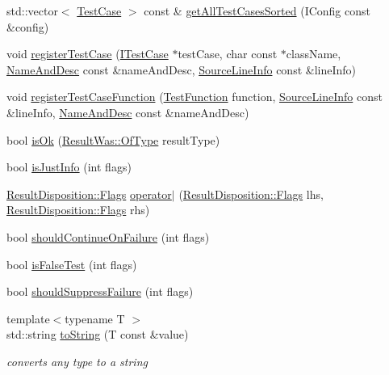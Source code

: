 \begin{DoxyCompactItemize}
\item 
std\-::vector$<$ \hyperlink{classCatch_1_1TestCase}{Test\-Case} $>$ const \& \hyperlink{namespaceCatch_a1c9b1a23bc947ea70ddaabf067276cf2}{get\-All\-Test\-Cases\-Sorted} (I\-Config const \&config)
\item 
void \hyperlink{namespaceCatch_a9a59d681cc327a33c280796561dfe258}{register\-Test\-Case} (\hyperlink{structCatch_1_1ITestCase}{I\-Test\-Case} $\ast$test\-Case, char const $\ast$class\-Name, \hyperlink{structCatch_1_1NameAndDesc}{Name\-And\-Desc} const \&name\-And\-Desc, \hyperlink{structCatch_1_1SourceLineInfo}{Source\-Line\-Info} const \&line\-Info)
\item 
void \hyperlink{namespaceCatch_a220159aeff47f9c5231e893f2abbc643}{register\-Test\-Case\-Function} (\hyperlink{namespaceCatch_a768da872b9033e4c71c6f316393d35db}{Test\-Function} function, \hyperlink{structCatch_1_1SourceLineInfo}{Source\-Line\-Info} const \&line\-Info, \hyperlink{structCatch_1_1NameAndDesc}{Name\-And\-Desc} const \&name\-And\-Desc)
\item 
bool \hyperlink{namespaceCatch_a5205869c81c06d3460759cb86676ae68}{is\-Ok} (\hyperlink{structCatch_1_1ResultWas_a624e1ee3661fcf6094ceef1f654601ef}{Result\-Was\-::\-Of\-Type} result\-Type)
\item 
bool \hyperlink{namespaceCatch_a54b01af61673a3e1f21f31713639b180}{is\-Just\-Info} (int flags)
\item 
\hyperlink{structCatch_1_1ResultDisposition_a3396cad6e2259af326b3aae93e23e9d8}{Result\-Disposition\-::\-Flags} \hyperlink{namespaceCatch_ab32a083e442cc09f736327d2e2865999}{operator$\vert$} (\hyperlink{structCatch_1_1ResultDisposition_a3396cad6e2259af326b3aae93e23e9d8}{Result\-Disposition\-::\-Flags} lhs, \hyperlink{structCatch_1_1ResultDisposition_a3396cad6e2259af326b3aae93e23e9d8}{Result\-Disposition\-::\-Flags} rhs)
\item 
bool \hyperlink{namespaceCatch_a7f7480b15d74965459c844f0d393ed87}{should\-Continue\-On\-Failure} (int flags)
\item 
bool \hyperlink{namespaceCatch_a93ef4e3e307a2021ca0d41b32c0e54b0}{is\-False\-Test} (int flags)
\item 
bool \hyperlink{namespaceCatch_ab91eb13081203d634fe48d3d2ab386d7}{should\-Suppress\-Failure} (int flags)
\item 
{\footnotesize template$<$typename T $>$ }\\std\-::string \hyperlink{namespaceCatch_a386cb19a84b12339486771ad143a95ae}{to\-String} (T const \&value)
\begin{DoxyCompactList}\small\item\em converts any type to a string \end{DoxyCompactList}\item 

\end{DoxyCompactItemize}
